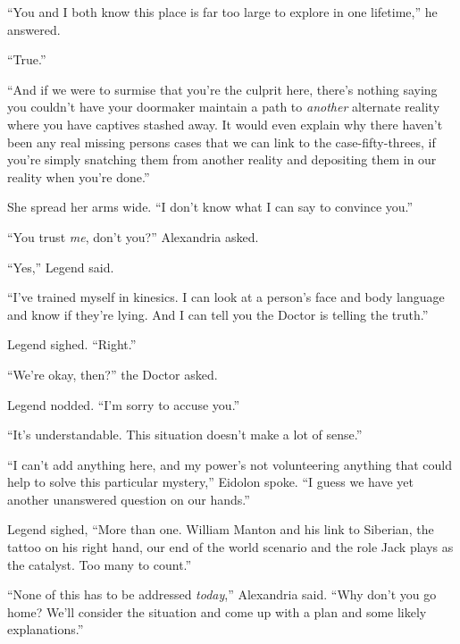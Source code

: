 ``You and I both know this place is far too large to explore in one lifetime,'' he answered.



``True.''



``And if we were to surmise that you're the culprit here, there's nothing saying you couldn't have your doormaker maintain a path to \emph{another} alternate reality where you have captives stashed away.  It would even explain why there haven't been any real missing persons cases that we can link to the case-fifty-threes, if you're simply snatching them from another reality and depositing them in our reality when you're done.''



She spread her arms wide.  ``I don't know what I can say to convince you.''



``You trust \emph{me}, don't you?'' Alexandria asked.



``Yes,'' Legend said.



``I've trained myself in kinesics.  I can look at a person's face and body language and know if they're lying.  And I can tell you the Doctor is telling the truth.''



Legend sighed.  ``Right.''



``We're okay, then?'' the Doctor asked.



Legend nodded.  ``I'm sorry to accuse you.''



``It's understandable.  This situation doesn't make a lot of sense.''



``I can't add anything here, and my power's not volunteering anything that could help to solve this particular mystery,'' Eidolon spoke.  ``I guess we have yet another unanswered question on our hands.''



Legend sighed, ``More than one.  William Manton and his link to Siberian, the tattoo on his right hand, our end of the world scenario and the role Jack plays as the catalyst.  Too many to count.''



``None of this has to be addressed \emph{today},'' Alexandria said.  ``Why don't you go home?  We'll consider the situation and come up with a plan and some likely explanations.''



